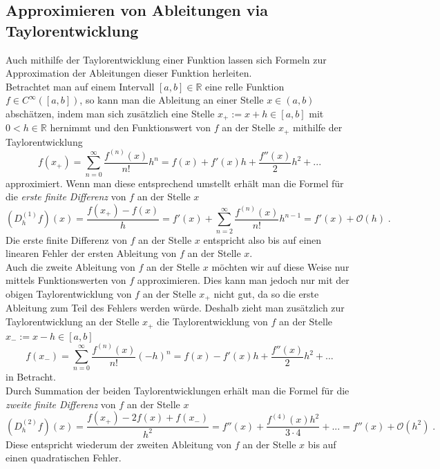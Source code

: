 \documentclass{scrartcl}
\begin{document}
\subsection{Approximieren von Ableitungen via Taylorentwicklung}
\label{ssec:herleitung2}
Auch mithilfe der Taylorentwicklung einer Funktion lassen sich Formeln zur Approximation der Ableitungen dieser Funktion herleiten.\\
Betrachtet man auf einem Intervall $[a,b]\in\mathbb{R}$ eine relle Funktion $f\in C^\infty([a,b])$, so kann man die Ableitung an einer Stelle $x\in(a,b)$ abschätzen, indem man sich zusätzlich eine Stelle $x_+ := x+h\in[a,b]$ mit $0<h\in\mathbb{R}$ hernimmt und den Funktionswert von $f$ an der Stelle $x_+$ mithilfe der Taylorentwicklung
\[f(x_+)=\sum_{n=0}^{\infty}\frac{f^{(n)}(x)}{n!}h^n=f(x)+f'(x)h+\frac{f''(x)}{2}h^2+...\]
approximiert.
Wenn man diese entsprechend umstellt erhält man die Formel für die \textit{erste finite Differenz} von $f$ an der Stelle $x$
\[(D_h^{(1)}f)(x)=\frac{f(x_+)-f(x)}{h}=f'(x)+\sum_{n=2}^{\infty}\frac{f^{(n)}(x)}{n!}h^{n-1}=f'(x)+\mathcal{O}(h)\;.\]
Die erste finite Differenz von $f$ an der Stelle $x$ entspricht also bis auf einen linearen Fehler der ersten Ableitung von $f$ an der Stelle $x$.\\
Auch die zweite Ableitung von $f$ an der Stelle $x$ möchten wir auf diese Weise nur mittels Funktionswerten von $f$ approximieren.
Dies kann man jedoch nur mit der obigen Taylorentwicklung von $f$ an der Stelle $x_+$ nicht gut, da so die erste Ableitung zum Teil des Fehlers werden würde.
Deshalb zieht man zusätzlich zur Taylorentwicklung an der Stelle $x_+$ die Taylorentwicklung von $f$ an der Stelle $x_-:=x-h\in[a,b]$
\[f(x_-)=\sum_{n=0}^{\infty}\frac{f^{(n)}(x)}{n!}(-h)^n=f(x)-f'(x)h+\frac{f''(x)}{2}h^2+...\]
in Betracht.\\
Durch Summation der beiden Taylorentwicklungen erhält man die Formel für die \textit{zweite finite Differenz} von $f$ an der Stelle $x$
\[(D_h^{(2)}f)(x)=\frac{f(x_+)-2f(x)+f(x_-)}{h^2}=f''(x)+\frac{f^{(4)}(x)h^2}{3\cdot4}+...=f''(x)+\mathcal{O}(h^2)\;.\]
Diese entspricht wiederum der zweiten Ableitung von $f$ an der Stelle $x$ bis auf einen quadratischen Fehler.
\end{document}
